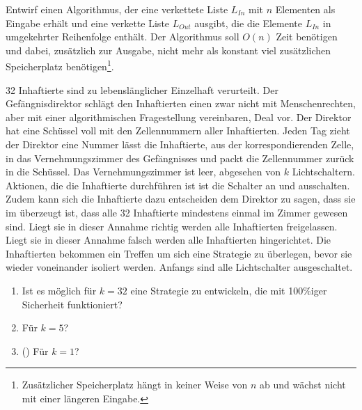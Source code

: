 \documentclass{uebung_cs}
\begin{document}
\begin{aufgabe}
	Entwirf einen Algorithmus, der eine verkettete Liste $L_{In}$ mit $n$ Elementen als Eingabe erhält und eine verkette Liste $L_{Out}$ ausgibt, die die Elemente $L_{In}$ in umgekehrter Reihenfolge enthält.
	Der Algorithmus soll $O(n)$ Zeit benötigen und dabei, zusätzlich zur Ausgabe, nicht mehr als konstant viel zusätzlichen Speicherplatz benötigen\footnote{Zusätzlicher Speicherplatz hängt in keiner Weise von $n$ ab und wächst nicht mit einer längeren Eingabe.}.
\end{aufgabe}

\begin{aufgabe}
	32 Inhaftierte sind zu lebenslänglicher Einzelhaft verurteilt.
	Der Gefängnisdirektor schlägt den Inhaftierten einen zwar nicht mit Menschenrechten, aber mit einer algorithmischen Fragestellung vereinbaren, Deal vor.
	Der Direktor hat eine Schüssel voll mit den Zellennummern aller Inhaftierten.
	Jeden Tag zieht der Direktor eine Nummer lässt die Inhaftierte, aus der korrespondierenden Zelle, in das Vernehmungszimmer des Gefängnisses und packt die Zellennummer zurück in die Schüssel.
	Das Vernehmungszimmer ist leer, abgesehen von $k$ Lichtschaltern.
	Aktionen, die die Inhaftierte durchführen ist ist die Schalter an und ausschalten.
	Zudem kann sich die Inhaftierte dazu entscheiden dem Direktor zu sagen, dass sie im überzeugt ist, dass alle 32 Inhaftierte mindestens einmal im Zimmer gewesen sind.
	Liegt sie in dieser Annahme richtig werden alle Inhaftierten freigelassen.
	Liegt sie in dieser Annahme falsch werden alle Inhaftierten hingerichtet.
	Die Inhaftierten bekommen ein Treffen um sich eine Strategie zu überlegen, bevor sie wieder voneinander isoliert werden.
	Anfangs sind alle Lichtschalter ausgeschaltet.
	\begin{enumerate}
		\item Ist es möglich für $k=32$ eine Strategie zu entwickeln, die mit 100\%iger Sicherheit funktioniert?
		\item Für $k=5$?
		\item (\veryhard) Für $k=1$?
	\end{enumerate}
\end{aufgabe}
\end{document}
